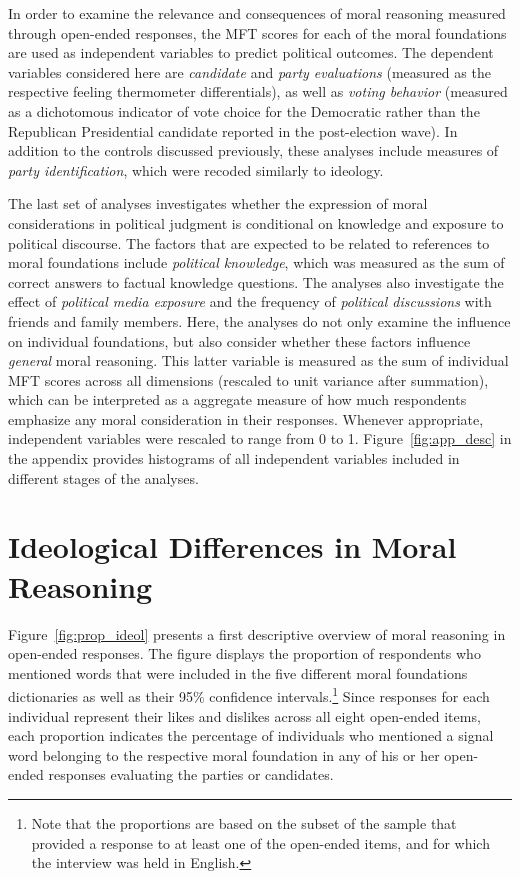 \documentclass[12pt]{article}
\begin{document}
In order to examine the relevance and consequences of moral reasoning measured through open-ended responses, the MFT scores for each of the moral foundations are used as independent variables to predict political outcomes. The dependent variables considered here are \textit{candidate} and \textit{party evaluations} (measured as the respective feeling thermometer differentials), as well as \textit{voting behavior} (measured as a dichotomous indicator of vote choice for the Democratic rather than the Republican Presidential candidate reported in the post-election wave). In addition to the controls discussed previously, these analyses include measures of \textit{party identification}, which were recoded similarly to ideology.

The last set of analyses investigates whether the expression of moral considerations in political judgment is conditional on knowledge and exposure to political discourse. The factors that are expected to be related to references to moral foundations include \textit{political knowledge}, which was measured as the sum of correct answers to factual knowledge questions. The analyses also investigate the effect of \textit{political media exposure} and the frequency of \textit{political discussions} with friends and family members. Here, the analyses do not only examine the influence on individual foundations, but also consider whether these factors influence \textit{general} moral reasoning. This latter variable is measured as the sum of individual MFT scores across all dimensions (rescaled to unit variance after summation), which can be interpreted as a aggregate measure of how much respondents emphasize any moral consideration in their responses. Whenever appropriate, independent variables were rescaled to range from 0 to 1. Figure~\ref{fig:app_desc} in the appendix provides histograms of all independent variables included in different stages of the analyses.


\section*{Ideological Differences in Moral Reasoning}

Figure~\ref{fig:prop_ideol} presents a first descriptive overview of moral reasoning in open-ended responses. The figure displays the proportion of respondents who mentioned words that were included in the five different moral foundations dictionaries as well as their 95\% confidence intervals.\footnote{Note that the proportions are based on the subset of the sample that provided a response to at least one of the open-ended items, and for which the interview was held in English.} Since responses for each individual represent their likes and dislikes across all eight open-ended items, each proportion indicates the percentage of individuals who mentioned a signal word belonging to the respective moral foundation in any of his or her open-ended responses evaluating the parties or candidates.
\end{document}
